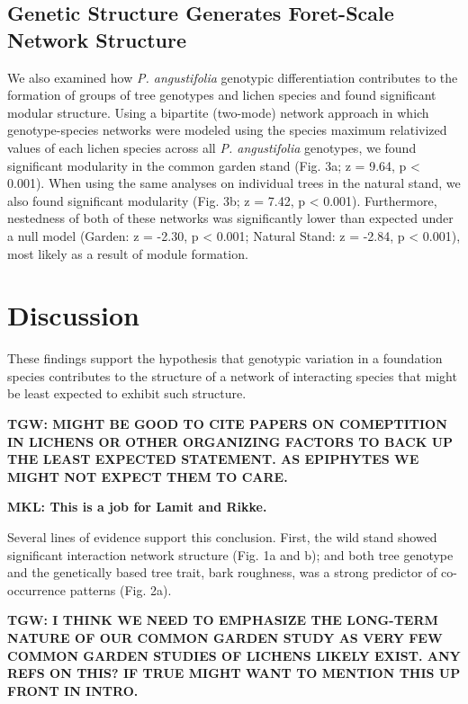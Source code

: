 \documentclass[fleqn,10pt]{wlscirep}
\begin{document}
\subsection*{Genetic Structure Generates Foret-Scale Network Structure}

We also examined how \textit{P. angustifolia} genotypic
differentiation contributes to the formation of groups of tree
genotypes and lichen species and found significant modular
structure. Using a bipartite (two-mode) network approach in which
genotype-species networks were modeled using the species maximum
relativized values of each lichen species across all
\textit{P. angustifolia} genotypes, we found significant modularity in
the common garden stand (Fig. 3a; z = 9.64, p < 0.001). When using the
same analyses on individual trees in the natural stand, we also found
significant modularity (Fig. 3b; z = 7.42, p < 0.001). Furthermore,
nestedness of both of these networks was significantly lower than
expected under a null model (Garden: z = -2.30, p < 0.001; Natural
Stand: z = -2.84, p < 0.001), most likely as a result of module
formation.



\section*{Discussion}


These findings support the hypothesis that genotypic variation in a
foundation species contributes to the structure of a network of
interacting species that might be least expected to exhibit such
structure. 

\textbf{TGW: MIGHT BE GOOD TO CITE PAPERS ON COMEPTITION IN LICHENS OR
OTHER ORGANIZING FACTORS TO BACK UP THE LEAST EXPECTED STATEMENT.  AS
EPIPHYTES WE MIGHT NOT EXPECT THEM TO CARE.}

\textbf{MKL: This is a job for Lamit and Rikke.}

Several lines of evidence support this conclusion. First, the wild
stand showed significant interaction network structure (Fig. 1a and
b); and both tree genotype and the genetically based tree trait, bark
roughness, was a strong predictor of co-occurrence patterns
(Fig. 2a). 

\textbf{TGW: I THINK WE NEED TO EMPHASIZE THE LONG-TERM NATURE OF OUR
COMMON GARDEN STUDY AS VERY FEW COMMON GARDEN STUDIES OF LICHENS
LIKELY EXIST. ANY REFS ON THIS? IF TRUE MIGHT WANT TO MENTION THIS UP
FRONT IN INTRO.}
\end{document}
